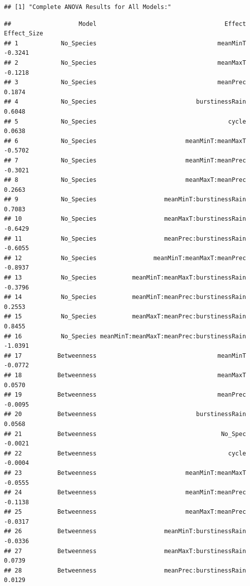 \documentclass[
]{article}
\begin{document}
\begin{verbatim}
## [1] "Complete ANOVA Results for All Models:"
\end{verbatim}

\begin{verbatim}
##                   Model                                    Effect Effect_Size
## 1            No_Species                                  meanMinT     -0.3241
## 2            No_Species                                  meanMaxT     -0.1218
## 3            No_Species                                  meanPrec      0.1874
## 4            No_Species                            burstinessRain      0.6048
## 5            No_Species                                     cycle      0.0638
## 6            No_Species                         meanMinT:meanMaxT     -0.5702
## 7            No_Species                         meanMinT:meanPrec     -0.3021
## 8            No_Species                         meanMaxT:meanPrec      0.2663
## 9            No_Species                   meanMinT:burstinessRain      0.7083
## 10           No_Species                   meanMaxT:burstinessRain     -0.6429
## 11           No_Species                   meanPrec:burstinessRain     -0.6055
## 12           No_Species                meanMinT:meanMaxT:meanPrec     -0.8937
## 13           No_Species          meanMinT:meanMaxT:burstinessRain     -0.3796
## 14           No_Species          meanMinT:meanPrec:burstinessRain      0.2553
## 15           No_Species          meanMaxT:meanPrec:burstinessRain      0.8455
## 16           No_Species meanMinT:meanMaxT:meanPrec:burstinessRain     -1.0391
## 17          Betweenness                                  meanMinT     -0.0772
## 18          Betweenness                                  meanMaxT      0.0570
## 19          Betweenness                                  meanPrec     -0.0095
## 20          Betweenness                            burstinessRain      0.0568
## 21          Betweenness                                   No_Spec     -0.0021
## 22          Betweenness                                     cycle     -0.0004
## 23          Betweenness                         meanMinT:meanMaxT     -0.0555
## 24          Betweenness                         meanMinT:meanPrec     -0.1138
## 25          Betweenness                         meanMaxT:meanPrec     -0.0317
## 26          Betweenness                   meanMinT:burstinessRain     -0.0336
## 27          Betweenness                   meanMaxT:burstinessRain      0.0739
## 28          Betweenness                   meanPrec:burstinessRain      0.0129

\end{verbatim}
\end{document}
